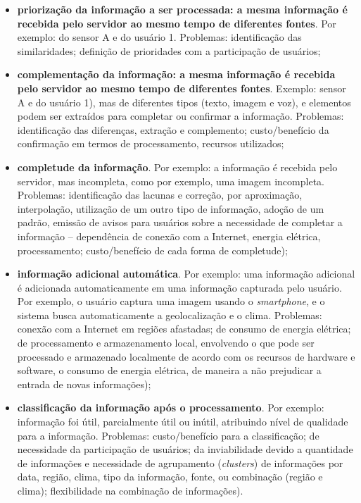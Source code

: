 \documentclass[12pt]{article}
\begin{document}
\begin{itemize}
		\begin{itemize}
			\item \textbf{priorização da informação a ser processada: a mesma informação é recebida pelo servidor ao mesmo tempo de diferentes fontes}. Por exemplo: do sensor A e do usuário 1. Problemas: identificação das similaridades; definição de prioridades com a participação de usuários;
			\item \textbf{complementação da informação: a mesma informação é recebida pelo servidor ao mesmo tempo de diferentes fontes}. Exemplo: sensor A e do usuário 1), mas de diferentes tipos (texto, imagem e voz), e elementos podem ser extraídos para completar ou confirmar a informação. Problemas: identificação das diferenças, extração e complemento; custo/benefício da  confirmação em termos de processamento, recursos utilizados;
			\item \textbf{completude da informação}. Por exemplo: a informação é recebida pelo servidor, mas incompleta, como por exemplo, uma imagem incompleta. Problemas: identificação das lacunas e correção, por aproximação, interpolação, utilização de um outro tipo de informação, adoção de um padrão, emissão de avisos para usuários sobre a necessidade de completar a informação – dependência de conexão com a Internet, energia elétrica, processamento; custo/benefício de cada forma de completude);
			\item \textbf{informação adicional automática}. Por exemplo: uma informação adicional é adicionada automaticamente em uma informação capturada pelo usuário. Por exemplo, o usuário captura uma imagem usando o \textit{smartphone}, e o sistema busca automaticamente a geolocalização e o clima. Problemas: conexão com a Internet em regiões afastadas; de consumo de energia elétrica; de processamento e armazenamento local, envolvendo o que pode ser processado e armazenado localmente de acordo com os recursos de hardware e software, o consumo de energia elétrica, de maneira a não prejudicar a entrada de novas informações);
			\item \textbf{classificação da informação após o processamento}. Por exemplo: informação foi útil, parcialmente útil ou inútil, atribuindo nível de qualidade para a informação. Problemas: custo/benefício para a classificação; de necessidade da participação de usuários; da inviabilidade devido a quantidade de informações e necessidade de agrupamento (\textit{clusters}) de informações por data, região, clima, tipo da informação, fonte, ou combinação (região e clima); flexibilidade na combinação de informações).
		\end{itemize}
\end{itemize}
\end{document}
